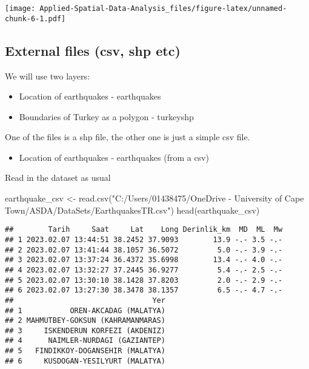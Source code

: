 \documentclass[
]{book}
\newenvironment{Shaded}{\begin{snugshade}}{\end{snugshade}}
\newcommand{\FunctionTok}[1]{\textcolor[rgb]{0.00,0.00,0.00}{#1}}
\newcommand{\NormalTok}[1]{#1}
\newcommand{\OtherTok}[1]{\textcolor[rgb]{0.56,0.35,0.01}{#1}}
\newcommand{\StringTok}[1]{\textcolor[rgb]{0.31,0.60,0.02}{#1}}
\providecommand{\tightlist}{%
  \setlength{\itemsep}{0pt}\setlength{\parskip}{0pt}}
\begin{document}
\texttt{[image: Applied-Spatial-Data-Analysis\_files/figure-latex/unnamed-chunk-6-1.pdf]}

\hypertarget{external-files-csv-shp-etc}{%
\subsection{External files (csv, shp etc)}\label{external-files-csv-shp-etc}}

We will use two layers:

\begin{itemize}
\tightlist
\item
  Location of earthquakes - earthquakes
\item
  Boundaries of Turkey as a polygon - turkeyshp
\end{itemize}

One of the files is a shp file, the other one is just a simple csv file.

\begin{itemize}
\tightlist
\item
  Location of earthquakes - earthquakes (from a csv)
\end{itemize}

Read in the dataset as usual

\begin{Shaded}
\begin{Highlighting}[]
\NormalTok{earthquake\_csv }\OtherTok{\textless{}{-}} \FunctionTok{read.csv}\NormalTok{(}\StringTok{"C:/Users/01438475/OneDrive {-} University of Cape Town/ASDA/DataSets/EarthquakesTR.csv"}\NormalTok{)}
\FunctionTok{head}\NormalTok{(earthquake\_csv)}
\end{Highlighting}
\end{Shaded}

\begin{verbatim}
##        Tarih     Saat     Lat    Long Derinlik_km  MD  ML  Mw
## 1 2023.02.07 13:44:51 38.2452 37.9093        13.9 -.- 3.5 -.-
## 2 2023.02.07 13:41:44 38.1057 36.5072         5.0 -.- 3.9 -.-
## 3 2023.02.07 13:37:24 36.4372 35.6998        13.4 -.- 4.0 -.-
## 4 2023.02.07 13:32:27 37.2445 36.9277         5.4 -.- 2.5 -.-
## 5 2023.02.07 13:30:10 38.1428 37.8203         2.0 -.- 2.9 -.-
## 6 2023.02.07 13:27:30 38.3478 38.1357         6.5 -.- 4.7 -.-
##                                Yer
## 1           OREN-AKCADAG (MALATYA)
## 2 MAHMUTBEY-GOKSUN (KAHRAMANMARAS)
## 3     ISKENDERUN KORFEZI (AKDENIZ)
## 4      NAIMLER-NURDAGI (GAZIANTEP)
## 5   FINDIKKOY-DOGANSEHIR (MALATYA)
## 6     KUSDOGAN-YESILYURT (MALATYA)
\end{verbatim}
\end{document}
